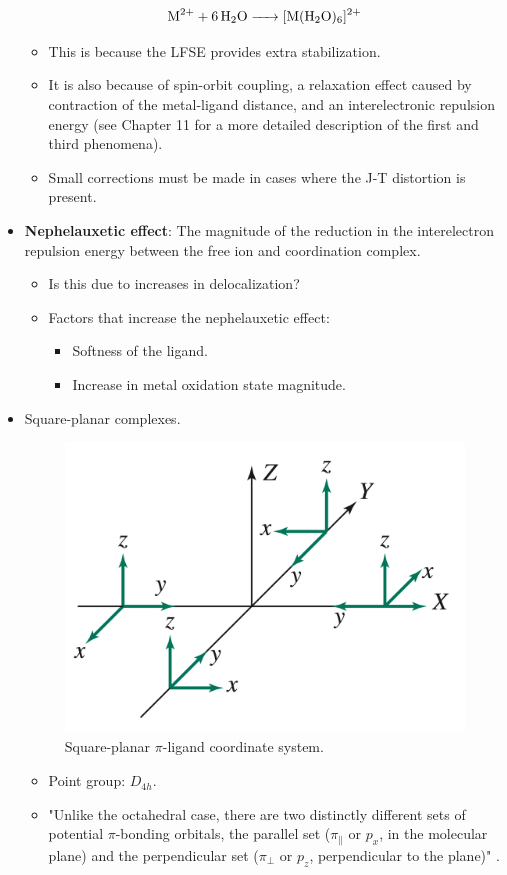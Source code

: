 \documentclass[../notes.tex]{subfiles}
\begin{document}
\begin{itemize}
    \begin{equation*}
        \ce{M^2+ + 6H2O -> [M(H2O)6]^2+}
    \end{equation*}
    \begin{itemize}
        \item This is because the LFSE provides extra stabilization.
        \item It is also because of spin-orbit coupling, a relaxation effect caused by contraction of the metal-ligand distance, and an interelectronic repulsion energy (see Chapter 11 for a more detailed description of the first and third phenomena).
        \item Small corrections must be made in cases where the J-T distortion is present.
    \end{itemize}
    \item \textbf{Nephelauxetic effect}: The magnitude of the reduction in the interelectron repulsion energy between the free ion and coordination complex.
    \begin{itemize}
        \item Is this due to increases in delocalization?
        \item Factors that increase the nephelauxetic effect:
        \begin{itemize}
            \item Softness of the ligand.
            \item Increase in metal oxidation state magnitude.
        \end{itemize}
    \end{itemize}
    \item {}Square-planar complexes.
    \begin{figure}[h!]
        \centering
        \includegraphics[width=0.3\linewidth]{../ExtFiles/piSquarePlanarLigand.png}
        \caption{Square-planar $\pi$-ligand coordinate system.}
        \label{fig:piSquarePlanarLigand}
    \end{figure}
    \begin{itemize}
        \item Point group: $D_{4h}$.
        \item "Unlike the octahedral case, there are two distinctly different sets of potential $\pi$-bonding orbitals, the parallel set ($\pi_\parallel$ or $p_x$, in the molecular plane) and the perpendicular set ($\pi_\perp$ or $p_z$, perpendicular to the plane)" \parencite[377]{bib:MiesslerFischerTarr}.

\end{itemize}
\end{itemize}
\end{document}
